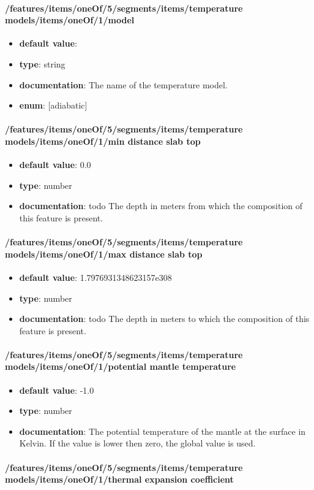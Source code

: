 \paragraph{/features/items/oneOf/5/segments/items/temperature models/items/oneOf/1/model}
\begin{itemize}\item {\bf default value}: 
\item {\bf type}: string
\item {\bf documentation}: The name of the temperature model.
\item {\bf enum}: [adiabatic]\end{itemize}\paragraph{/features/items/oneOf/5/segments/items/temperature models/items/oneOf/1/min distance slab top}
\begin{itemize}\item {\bf default value}: 0.0
\item {\bf type}: number
\item {\bf documentation}: todo The depth in meters from which the composition of this feature is present.
\end{itemize}\paragraph{/features/items/oneOf/5/segments/items/temperature models/items/oneOf/1/max distance slab top}
\begin{itemize}\item {\bf default value}: 1.7976931348623157e308
\item {\bf type}: number
\item {\bf documentation}: todo The depth in meters to which the composition of this feature is present.
\end{itemize}\paragraph{/features/items/oneOf/5/segments/items/temperature models/items/oneOf/1/potential mantle temperature}
\begin{itemize}\item {\bf default value}: -1.0
\item {\bf type}: number
\item {\bf documentation}: The potential temperature of the mantle at the surface in Kelvin. If the value is lower then zero, the global value is used.
\end{itemize}\paragraph{/features/items/oneOf/5/segments/items/temperature models/items/oneOf/1/thermal expansion coefficient}
